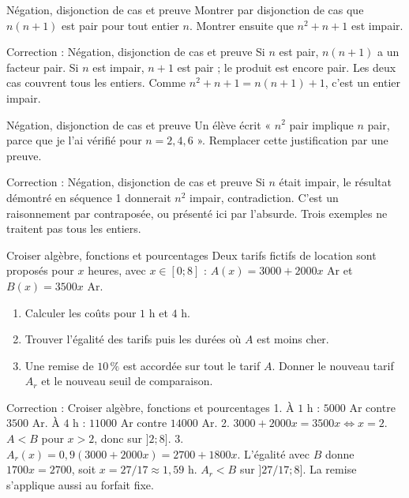 \documentclass[aspectratio=169,10pt]{beamer}
\begin{document}
\begin{frame}{Négation, disjonction de cas et preuve}
Montrer par disjonction de cas que \(n(n+1)\) est pair pour tout entier \(n\). Montrer ensuite que \(n^2+n+1\) est impair.
\end{frame}
\begin{frame}{Correction : Négation, disjonction de cas et preuve}
Si \(n\) est pair, \(n(n+1)\) a un facteur pair. Si \(n\) est impair, \(n+1\) est pair ; le produit est encore pair. Les deux cas couvrent tous les entiers. Comme \(n^2+n+1=n(n+1)+1\), c'est un entier impair.
\end{frame}
\begin{frame}{Négation, disjonction de cas et preuve}
Un élève écrit « \(n^2\) pair implique \(n\) pair, parce que je l'ai vérifié pour \(n=2,4,6\) ». Remplacer cette justification par une preuve.
\end{frame}
\begin{frame}{Correction : Négation, disjonction de cas et preuve}
Si \(n\) était impair, le résultat démontré en séquence 1 donnerait \(n^2\) impair, contradiction. C'est un raisonnement par contraposée, ou présenté ici par l'absurde. Trois exemples ne traitent pas tous les entiers.
\end{frame}
\begin{frame}{Croiser algèbre, fonctions et pourcentages}
Deux tarifs fictifs de location sont proposés pour \(x\) heures, avec \(x\in[0;8]\) : \(A(x)=3000+2000x\) Ar et \(B(x)=3500x\) Ar.

\begin{enumerate}
\setcounter{enumi}{0}\item Calculer les coûts pour \(1\) h et \(4\) h.
\item Trouver l'égalité des tarifs puis les durées où \(A\) est moins cher.
\item Une remise de \(10\,\%\) est accordée sur tout le tarif \(A\). Donner le nouveau tarif \(A_r\) et le nouveau seuil de comparaison.

\end{enumerate}
\end{frame}
\begin{frame}{Correction : Croiser algèbre, fonctions et pourcentages}
1. À \(1\) h : \(5000\) Ar contre \(3500\) Ar. À \(4\) h : \(11000\) Ar contre \(14000\) Ar. 2. \(3000+2000x=3500x\iff x=2\). \(A<B\) pour \(x>2\), donc sur \(]2;8]\). 3. \(A_r(x)=0{,}9(3000+2000x)=2700+1800x\). L'égalité avec \(B\) donne \(1700x=2700\), soit \(x=27/17\approx1{,}59\) h. \(A_r<B\) sur \(]27/17;8]\). La remise s'applique aussi au forfait fixe.
\end{frame}
\end{document}
